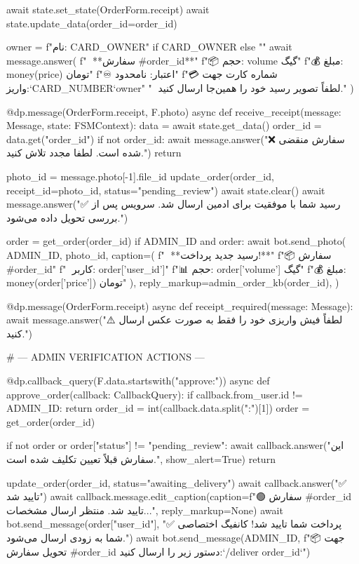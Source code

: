     await state.set_state(OrderForm.receipt)
    await state.update_data(order_id=order_id)

    owner = f" نام: {CARD_OWNER}" if CARD_OWNER else ""
    await message.answer(
        f"🧾 **سفارش #{order_id}**\n"
        f"📦 حجم: {volume} گیگ\n"
        f"💰 مبلغ: {money(price)} تومان\n"
        f"♾ اعتبار: نامحدود\n\n"
        f"💳 شماره کارت جهت واریز:\n`{CARD_NUMBER}`{owner}\n\n"
        "📸 لطفاً تصویر رسید خود را همین‌جا ارسال کنید."
    )

@dp.message(OrderForm.receipt, F.photo)
async def receive_receipt(message: Message, state: FSMContext):
    data = await state.get_data()
    order_id = data.get("order_id")
    if not order_id:
        await message.answer("❌ سفارش منقضی شده است. لطفا مجدد تلاش کنید.")
        return

    photo_id = message.photo[-1].file_id
    update_order(order_id, receipt_id=photo_id, status="pending_review")
    await state.clear()
    await message.answer("✅ رسید شما با موفقیت برای ادمین ارسال شد. سرویس پس از بررسی تحویل داده می‌شود.")

    order = get_order(order_id)
    if ADMIN_ID and order:
        await bot.send_photo(
            ADMIN_ID,
            photo_id,
            caption=(
                f"🚨 **رسید جدید پرداخت!**\n\n"
                f"📦 سفارش #{order_id}\n"
                f"👤 کاربر: {order['user_id']}\n"
                f"📊 حجم: {order['volume']} گیگ\n"
                f"💰 مبلغ: {money(order['price'])} تومان"
            ),
            reply_markup=admin_order_kb(order_id),
        )

@dp.message(OrderForm.receipt)
async def receipt_required(message: Message):
    await message.answer("⚠️ لطفاً فیش واریزی خود را فقط به صورت عکس ارسال کنید.")

# --- ADMIN VERIFICATION ACTIONS ---

@dp.callback_query(F.data.startswith("approve:"))
async def approve_order(callback: CallbackQuery):
    if callback.from_user.id != ADMIN_ID:
        return
    order_id = int(callback.data.split(":")[1])
    order = get_order(order_id)

    if not order or order["status"] != "pending_review":
        await callback.answer("این سفارش قبلاً تعیین تکلیف شده است.", show_alert=True)
        return

    update_order(order_id, status="awaiting_delivery")
    await callback.answer("✅ تایید شد")
    await callback.message.edit_caption(caption=f"🟢 سفارش #{order_id} تایید شد. منتظر ارسال مشخصات...", reply_markup=None)
    await bot.send_message(order["user_id"], "✅ پرداخت شما تایید شد! کانفیگ اختصاصی شما به زودی ارسال می‌شود.")
    await bot.send_message(ADMIN_ID, f"📦 جهت تحویل سفارش #{order_id} دستور زیر را ارسال کنید:\n\n`/deliver {order_id}`")

